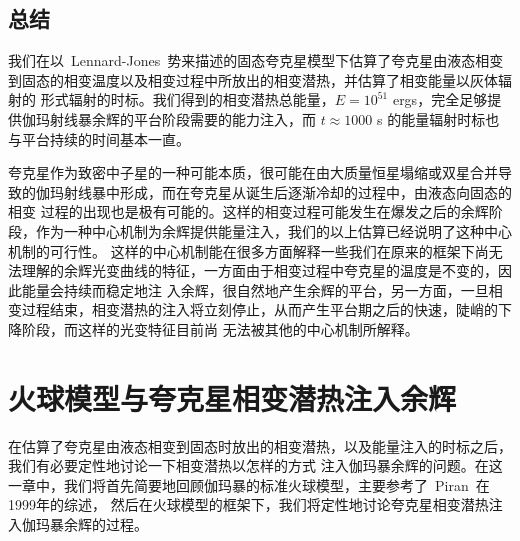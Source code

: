 												 \section{总结}
												 \label{chap2:sec6}

												 我们在以~Lennard-Jones~势来描述的固态夸克星模型下估算了夸克星由液态相变到固态的相变温度以及相变过程中所放出的相变潜热，并估算了相变能量以灰体辐射的
												 形式辐射的时标。我们得到的相变潜热总能量，$E=10^{51}$ ergs，完全足够提供伽玛射线暴余辉的平台阶段需要的能力注入，而 $t\approx1000$ s 的能量辐射时标也与平台持续的时间基本一直。

												 夸克星作为致密中子星的一种可能本质，很可能在由大质量恒星塌缩或双星合并导致的伽玛射线暴中形成，而在夸克星从诞生后逐渐冷却的过程中，由液态向固态的相变
												 过程的出现也是极有可能的。这样的相变过程可能发生在爆发之后的余辉阶段，作为一种中心机制为余辉提供能量注入，我们的以上估算已经说明了这种中心机制的可行性。
												 这样的中心机制能在很多方面解释一些我们在原来的框架下尚无法理解的余辉光变曲线的特征，一方面由于相变过程中夸克星的温度是不变的，因此能量会持续而稳定地注
												 入余辉，很自然地产生余辉的平台，另一方面，一旦相变过程结束，相变潜热的注入将立刻停止，从而产生平台期之后的快速，陡峭的下降阶段，而这样的光变特征目前尚
												 无法被其他的中心机制所解释。


	\chapter{火球模型与夸克星相变潜热注入余辉} \label{chap3}

	在估算了夸克星由液态相变到固态时放出的相变潜热，以及能量注入的时标之后，我们有必要定性地讨论一下相变潜热以怎样的方式
	注入伽玛暴余辉的问题。在这一章中，我们将首先简要地回顾伽玛暴的标准火球模型，主要参考了~Piran~在1999年的综述，
	然后在火球模型的框架下，我们将定性地讨论夸克星相变潜热注入伽玛暴余辉的过程。

